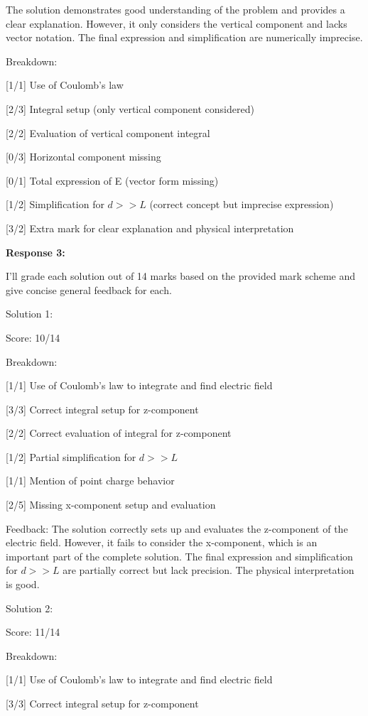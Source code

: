 \documentclass[a4paper,11pt]{article}
\begin{document}
The solution demonstrates good understanding of the problem and provides a clear explanation. However, it only considers the vertical component and lacks vector notation. The final expression and simplification are numerically imprecise.

Breakdown:

[1/1] Use of Coulomb's law

[2/3] Integral setup (only vertical component considered)

[2/2] Evaluation of vertical component integral

[0/3] Horizontal component missing

[0/1] Total expression of E (vector form missing)

[1/2] Simplification for \(d >> L\) (correct concept but imprecise expression)

[3/2] Extra mark for clear explanation and physical interpretation

\bigskip
\textbf{Response 3:}

I'll grade each solution out of 14 marks based on the provided mark scheme and give concise general feedback for each.

Solution 1:

Score: 10/14

Breakdown:

[1/1] Use of Coulomb's law to integrate and find electric field

[3/3] Correct integral setup for z-component

[2/2] Correct evaluation of integral for z-component

[1/2] Partial simplification for \(d >> L\)

[1/1] Mention of point charge behavior

[2/5] Missing x-component setup and evaluation

Feedback: The solution correctly sets up and evaluates the z-component of the electric field. However, it fails to consider the x-component, which is an important part of the complete solution. The final expression and simplification for \(d >> L\) are partially correct but lack precision. The physical interpretation is good.

Solution 2:

Score: 11/14

Breakdown:

[1/1] Use of Coulomb's law to integrate and find electric field

[3/3] Correct integral setup for z-component
\end{document}
